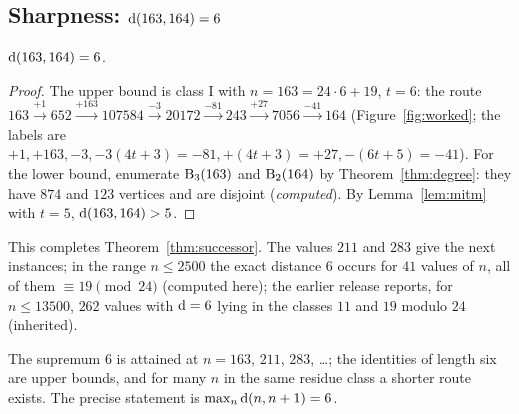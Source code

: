 \subsection{Sharpness: $\operatorname{d}(163,164)=6$}\label{ssec:sharp6}
\begin{proposition}\label{prop:163}
$\operatorname{d}(163,164)=6$.
\end{proposition}
\begin{proof}
The upper bound is class I with $n=163=24\cdot6+19$, $t=6$: the route $163\xrightarrow{+1}652\xrightarrow{+163}107584\xrightarrow{-3}20172\xrightarrow{-81}243\xrightarrow{+27}7056\xrightarrow{-41}164$ (Figure~\ref{fig:worked}; the labels are $+1,+163,-3,-3(4t+3)=-81,+(4t+3)=+27,-(6t+5)=-41$).
For the lower bound, enumerate $\operatorname{B}_3(163)$ and $\operatorname{B}_2(164)$ by Theorem~\ref{thm:degree}: they have $874$ and $123$ vertices and are disjoint (\emph{computed}). By Lemma~\ref{lem:mitm} with $t=5$, $\operatorname{d}(163,164)>5$.
\end{proof}
This completes Theorem~\ref{thm:successor}. The values $211$ and $283$ give the next instances; in the range $n\le2500$ the exact distance $6$ occurs for $41$ values of $n$, all of them $\equiv19\pmod{24}$ (computed here); the earlier release reports, for $n\le13500$, $262$ values with $\operatorname{d}=6$ lying in the classes $11$ and $19$ modulo $24$ (inherited).
\begin{remark}[Attainment]
The supremum $6$ is attained at $n=163$, $211$, $283$, \dots; the identities of length six are upper bounds, and for many $n$ in the same residue class a shorter route exists. The precise statement is $\max_n\operatorname{d}(n,n+1)=6$.
\end{remark}


